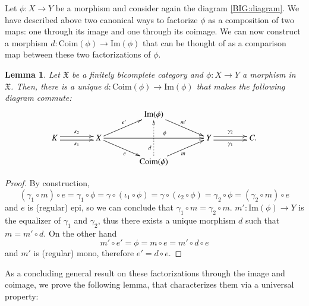 \documentclass[12pt]{article}
\newtheorem{lemma}{Lemma}[section]
\theoremstyle{definition}
\def\X{\mathfrak X}
\def\Coim{\mathrm{Coim}}
\def\Im{\mathrm{Im}}
\numberwithin{equation}{section}
\begin{document}
Let  $\phi\colon X\to Y$ be a morphism and consider again the diagram \eqref{BIG:diagram}. We have described above two canonical ways to factorize $\phi$ as a composition of two maps: one through its image and one through its coimage. We can now construct a morphism $d\colon \Coim(\phi)\to \Im(\phi)$ that can be thought of as a comparison map between these two factorizations of $\phi$.
\begin{lemma}\label{coim_im}
Let $\X$ be a finitely bicomplete category and $\phi\colon X\to Y$ a morphism in $\X$. Then, there is a unique  $d\colon \Coim(\phi)\to \Im(\phi)$ that makes the following diagram commute:
\[
\xymatrix@C=40pt@R=15pt{
 && \Im(\phi) \ar[dr]^{m'}  & & \\ 
K \ar@<-.5ex>[r]_-{\kappa_1} \ar@<.5ex>[r]^-{\kappa_2} &X \ar[ru]^{e'} \ar[rr]^(0.6){\phi}\ar[dr]_{e}&  & Y \ar@<-.5ex>[r]_-{\gamma_1} \ar@<.5ex>[r]^-{\gamma_2} & C.\\
& & \Coim(\phi) \ar[ur]_{m} \ar@{.>}[uu]^(0.3){d}  &  &
}
\]
\end{lemma}
\begin{proof}
By construction,
\[(\gamma_1\circ m)\circ e=\gamma_1\circ \phi =\gamma \circ (\iota_1\circ \phi) =\gamma \circ (\iota_2\circ \phi)=\gamma_2\circ \phi =(\gamma_2\circ m)\circ e\]
and $e$ is (regular) epi, so we can conclude that $\gamma_1\circ m=\gamma_2\circ m$.  $m'\colon \Im(\phi)\to Y$ is the equalizer of $\gamma_1$ and $\gamma_2$, thus there exists a unique morphism $d$ such that $m=m'\circ d$. On the other hand 
\[m'\circ e'=\phi=m\circ e=m'\circ d\circ e\]
and $m'$ is (regular) mono, therefore $e'=d\circ e$.
\end{proof}

As a concluding general result on these factorizations through the image and coimage, we prove the following lemma, that characterizes them via a universal property:
\end{document}
